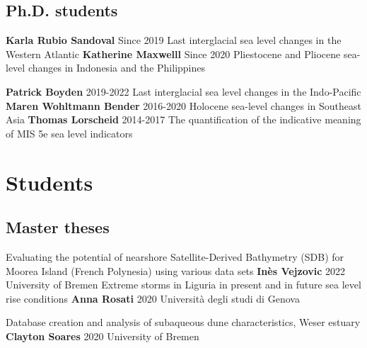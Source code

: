 \documentclass[%
               doublesided,
               paper=a4,
               fontsize=10pt
              ]{my-resume}
\begin{document}
{    \subsection{Ph.D. students}
      \publication
	{} %
	{\textbf{Karla Rubio Sandoval}} %
	{Since 2019} %
	{Last interglacial sea level changes in the Western Atlantic} %
	{} %
	 \publication
	{} %
	{\textbf{Katherine Maxwelll}} %
	{Since 2020} %
	{Pliestocene and Pliocene sea-level changes in Indonesia and the Philippines} %
	{} %

        \publication
	{} %
        {\textbf{Patrick Boyden}} %
	{2019-2022} %
	{Last interglacial sea level changes in the Indo-Pacific} %
	{} %
        \publication
	{} %
        {\textbf{Maren Wohltmann Bender}} %
	{2016-2020} %
	{Holocene sea-level changes in Southeast Asia} %
	{} %
         \publication
	{} %
        {\textbf{Thomas Lorscheid}} %
	{2014-2017} %
	{The quantification of the indicative meaning of MIS 5e sea level indicators} %
	{} %
	
	
}       
\makebody
\clearpage

\pagestyle{empty}
    \section[\faCompass]{Students}
    \subsection{Master theses}
    \setlength{\pubdatelength}{0.25 \linewidth}
    \publication
	{Evaluating the potential of nearshore Satellite-Derived Bathymetry (SDB) for Moorea Island (French Polynesia) using various data sets} %
	{\textbf{Inès Vejzovic}} %
	{2022} %
	{University of Bremen} %
	{} %
    \publication
	{Extreme storms in Liguria in present and in future sea level rise conditions} %
	{\textbf{Anna Rosati}} %
	{2020} %
	{Università degli studi di Genova} %
	{} %

    \publication
	{Database creation and analysis of subaqueous dune characteristics, Weser estuary} %
	{\textbf{Clayton Soares}} %
	{2020} %
	{University of Bremen} %
	{} %
\end{document}
